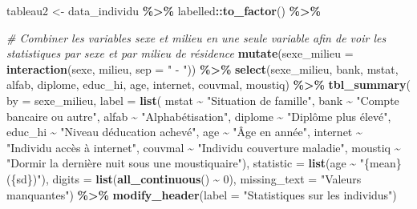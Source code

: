 \documentclass[
]{article}
\newenvironment{Shaded}{\begin{snugshade}}{\end{snugshade}}
\newcommand{\AttributeTok}[1]{\textcolor[rgb]{0.13,0.29,0.53}{#1}}
\newcommand{\CommentTok}[1]{\textcolor[rgb]{0.56,0.35,0.01}{\textit{#1}}}
\newcommand{\DecValTok}[1]{\textcolor[rgb]{0.00,0.00,0.81}{#1}}
\newcommand{\FunctionTok}[1]{\textcolor[rgb]{0.13,0.29,0.53}{\textbf{#1}}}
\newcommand{\NormalTok}[1]{#1}
\newcommand{\OtherTok}[1]{\textcolor[rgb]{0.56,0.35,0.01}{#1}}
\newcommand{\SpecialCharTok}[1]{\textcolor[rgb]{0.81,0.36,0.00}{\textbf{#1}}}
\newcommand{\StringTok}[1]{\textcolor[rgb]{0.31,0.60,0.02}{#1}}
\begin{document}
\begin{Shaded}
\begin{Highlighting}[]
\NormalTok{tableau2 }\OtherTok{\textless{}{-}}\NormalTok{ data\_individu }\SpecialCharTok{\%\textgreater{}\%}
\NormalTok{  labelled}\SpecialCharTok{::}\FunctionTok{to\_factor}\NormalTok{() }\SpecialCharTok{\%\textgreater{}\%}
  
  \CommentTok{\# Combiner les variables sexe et milieu en une seule variable afin de voir les statistiques par sexe et par milieu de résidence}
  \FunctionTok{mutate}\NormalTok{(}\AttributeTok{sexe\_milieu =} \FunctionTok{interaction}\NormalTok{(sexe, milieu, }\AttributeTok{sep =} \StringTok{" {-} "}\NormalTok{)) }\SpecialCharTok{\%\textgreater{}\%}
  \FunctionTok{select}\NormalTok{(sexe\_milieu, bank, mstat, alfab, diplome, educ\_hi, age, internet, couvmal, moustiq) }\SpecialCharTok{\%\textgreater{}\%}
  \FunctionTok{tbl\_summary}\NormalTok{(}
    \AttributeTok{by =}\NormalTok{ sexe\_milieu,}
    \AttributeTok{label =} \FunctionTok{list}\NormalTok{(}
\NormalTok{      mstat }\SpecialCharTok{\textasciitilde{}} \StringTok{"Situation de famille"}\NormalTok{,}
\NormalTok{      bank }\SpecialCharTok{\textasciitilde{}} \StringTok{"Compte bancaire ou autre"}\NormalTok{,}
\NormalTok{      alfab }\SpecialCharTok{\textasciitilde{}} \StringTok{"Alphabétisation"}\NormalTok{,}
\NormalTok{      diplome }\SpecialCharTok{\textasciitilde{}} \StringTok{"Diplôme plus élevé"}\NormalTok{,}
\NormalTok{      educ\_hi }\SpecialCharTok{\textasciitilde{}} \StringTok{"Niveau d\textquotesingle{}éducation achevé"}\NormalTok{,}
\NormalTok{      age }\SpecialCharTok{\textasciitilde{}} \StringTok{"Âge en année"}\NormalTok{,}
\NormalTok{      internet }\SpecialCharTok{\textasciitilde{}} \StringTok{"Individu accès à internet"}\NormalTok{,}
\NormalTok{      couvmal }\SpecialCharTok{\textasciitilde{}} \StringTok{"Individu couverture maladie"}\NormalTok{,}
\NormalTok{      moustiq }\SpecialCharTok{\textasciitilde{}} \StringTok{"Dormir la dernière nuit sous une moustiquaire"}\NormalTok{),}
    \AttributeTok{statistic =} \FunctionTok{list}\NormalTok{(age }\SpecialCharTok{\textasciitilde{}} \StringTok{"\{mean\} (\{sd\})"}\NormalTok{),  }
    \AttributeTok{digits =} \FunctionTok{list}\NormalTok{(}\FunctionTok{all\_continuous}\NormalTok{() }\SpecialCharTok{\textasciitilde{}} \DecValTok{0}\NormalTok{),  }
    \AttributeTok{missing\_text =} \StringTok{"Valeurs manquantes"}\NormalTok{) }\SpecialCharTok{\%\textgreater{}\%}
  \FunctionTok{modify\_header}\NormalTok{(}\AttributeTok{label =} \StringTok{"Statistiques sur les individus"}\NormalTok{)}
\end{Highlighting}
\end{Shaded}
\end{document}
